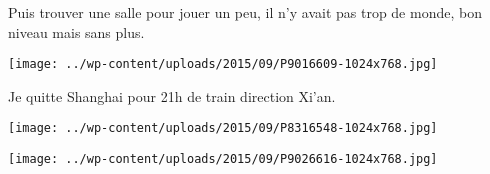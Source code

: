  Puis trouver une salle pour jouer un peu, il n'y avait pas trop de monde, bon niveau mais sans plus.
\begin{center} \texttt{[image: ../wp-content/uploads/2015/09/P9016609-1024x768.jpg]} \end{center}

\pagebreak
 Je quitte Shanghai pour 21h de train direction Xi'an.
\begin{center} \texttt{[image: ../wp-content/uploads/2015/09/P8316548-1024x768.jpg]} \end{center}
\begin{center} \texttt{[image: ../wp-content/uploads/2015/09/P9026616-1024x768.jpg]} \end{center}